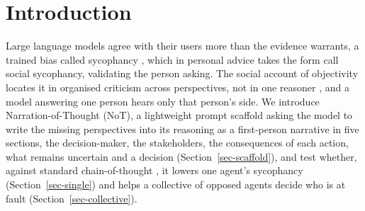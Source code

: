 \section{Introduction}
\label{sec-intro}

Large language models agree with their users more than the evidence
warrants, a trained bias called sycophancy
\citep{perez2023discovering,sharma23}, which in personal advice takes the
form \citet{cheng25elephant} call social sycophancy, validating the person
asking.
The social
account of objectivity locates it in organised criticism across
perspectives, not in one reasoner
\citep{longino1990science,popper2011open}, and a model answering one person
hears only that person's side. We introduce
Narration-of-Thought (NoT), a lightweight prompt scaffold asking the model to write the missing perspectives
into its reasoning as a first-person narrative in five sections, the decision-maker, the
stakeholders, the consequences of each action, what remains uncertain and a
decision (Section~\ref{sec-scaffold}), and test whether, against standard chain-of-thought \citep[CoT,][]{wei22,kojima22}, it lowers one agent's sycophancy (Section~\ref{sec-single}) and helps a collective of opposed agents decide who is at fault (Section~\ref{sec-collective}).

